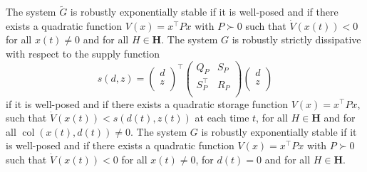 \documentclass[11pt,a4paper,oneside,DIV=12,headings=small]{scrartcl}
\newcommand{\col}{\operatorname{col}}
\theoremstyle{plain}
\begin{document}
The system $\tilde{G}$ is robustly exponentially stable if it is well-posed and if there exists a quadratic function $V(x)=x^\top P x$ with $P\succ 0$ such that $\dot{V}(x(t))<0$ for all $x(t)\neq 0$ and for all $H \in \mathbf{H}$.
The system $G$ is robustly strictly dissipative with respect to the supply function 
\begin{equation}
\label{SupplyPerformance}
s(d,z)=\begin{pmatrix}
  d\\
  z\\
\end{pmatrix}^{\top}
\begin{pmatrix}
  Q_P & S_P\\
  S_P^{\top} & R_P\\
\end{pmatrix}
\begin{pmatrix}
  d\\
  z\\
\end{pmatrix}
\end{equation}
if it is well-posed and if there exists a quadratic storage function $V(x)=x^\top P x$, such that $\dot{V}(x(t)) < s(d(t),z(t))$ at each time $t$, for all $H \in \mathbf{H}$ and for all $\col(x(t),d(t))\neq 0$.
The system $G$ is robustly exponentially stable if it is well-posed and if there exists a quadratic function $V(x)=x^\top P x$ with $P\succ 0$ such that $\dot{V}(x(t))<0$ for all $x(t)\neq 0$, for $d(t)=0$ and for all $H \in \mathbf{H}$.  
\end{document}
